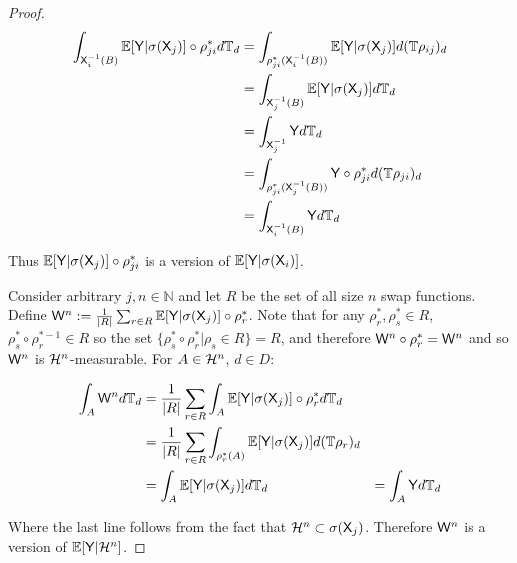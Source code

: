 \begin{proof}
\begin{align}
    \int_{\mathsf{X}_i^{-1}(B)} \mathbb{E}[\mathsf{Y}|\sigma(\mathsf{X}_j)] \circ \rho^*_{ji} d\mathbb{T}_d &= \int_{\rho^*_{ji}(\mathsf{X}_i^{-1}(B))} \mathbb{E}[\mathsf{Y}|\sigma(\mathsf{X}_j)] d(\mathbb{T}\rho_{ij})_d\\
                                                                               &= \int_{\mathsf{X}^{-1}_{j}(B)} \mathbb{E}[\mathsf{Y}|\sigma(\mathsf{X}_j)] d\mathbb{T}_d\\
                                                                               &= \int_{\mathsf{X}_j^{-1}} \mathsf{Y} d\mathbb{T}_d\\
                                                                               &= \int_{\rho_{ji}^*(\mathsf{X}_j^{-1}(B))}\mathsf{Y}\circ \rho^*_{ji} d(\mathbb{T}\rho_{ji})_d\\
                                                                               &= \int_{\mathsf{X}_i^{-1}(B)} \mathsf{Y}d\mathbb{T}_d
\end{align}

Thus $\mathbb{E}[\mathsf{Y}|\sigma(\mathsf{X}_j)]\circ\rho^*_{ji}$ is a version of $\mathbb{E}[\mathsf{Y}|\sigma({\mathsf{X}_i})]$.

Consider arbitrary $j,n\in \mathbb{N}$ and let $R$ be the set of all size $n$ swap functions. Define $\mathsf{W}^n := \frac{1}{|R|}\sum_{r\in R} \mathbb{E}[\mathsf{Y}|\sigma(\mathsf{X}_j)]\circ \rho^*_r$. Note that for any $\rho^*_r,\rho^*_s\in R$, $\rho^*_s\circ\rho^{*-1}_r\in R$ so the set $\{\rho^*_s\circ\rho^*_r|\rho_s\in R\}=R$, and therefore $\mathsf{W}^n\circ \rho^*_r=\mathsf{W}^n$ and so $\mathsf{W}^n$ is $\mathcal{H}^n$-measurable. For $A\in\mathcal{H}^n$, $d\in D$:

\begin{align}
    \int_A \mathsf{W}^n d\mathbb{T}_d &= \frac{1}{|R|}\sum_{r\in R} \int_A \mathbb{E}[\mathsf{Y}|\sigma(\mathsf{X}_j)]\circ \rho^*_{r} d\mathbb{T}_d\\
                                  &= \frac{1}{|R|}\sum_{r\in R} \int_{\rho_r^*(A)} \mathbb{E}[\mathsf{Y}|\sigma(\mathsf{X}_j)]d(\mathbb{T}\rho_r)_d\\
                                  &= \int_{A} \mathbb{E}[\mathsf{Y}|\sigma(\mathsf{X}_j)]d\mathbb{T}_d
                                  &= \int_{A} \mathsf{Y} d\mathbb{T}_d
\end{align}

Where the last line follows from the fact that $\mathcal{H}^n\subset \sigma(\mathsf{X}_j)$. Therefore $\mathsf{W}^n$ is a version of $\mathbb{E}[\mathsf{Y}|\mathcal{H}^n]$.


\end{proof}
